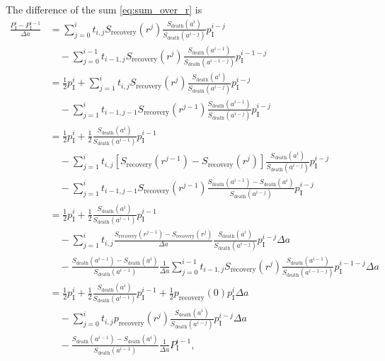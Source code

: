 \documentclass[12pt]{article}
\begin{document}
The difference of the sum \eqref{eq:sum_over_r} is
\begin{equation}
  \label{eq:sum_difference}
  \begin{split}
    \frac{P_{\mathrm{I}}^i - P_{\mathrm{I}}^{i - 1}}{\Delta a}
    &=
    \sum_{j = 0}^i t_{i, j} S_{\text{recovery}}(r^j)
    \frac{S_{\text{death}}(a^i)}{S_{\text{death}}(a^{i - j})}
    p_{\mathrm{I}}^{i - j}
    \\ & \quad {}
    - \sum_{j = 0}^{i - 1} t_{i - 1, j} S_{\text{recovery}}(r^j)
    \frac{S_{\text{death}}(a^{i - 1})}{S_{\text{death}}(a^{i - 1 - j})}
    p_{\mathrm{I}}^{i - 1 - j}
    \\
    &= \frac{1}{2} p_{\mathrm{I}}^i
    + \sum_{j = 1}^i t_{i, j} S_{\text{recovery}}(r^j)
    \frac{S_{\text{death}}(a^i)}{S_{\text{death}}(a^{i - j})}
    p_{\mathrm{I}}^{i - j}
    \\ & \quad {}
    - \sum_{j = 1}^i t_{i - 1, j - 1} S_{\text{recovery}}(r^{j - 1})
    \frac{S_{\text{death}}(a^{i - 1})}{S_{\text{death}}(a^{i - j})}
    p_{\mathrm{I}}^{i - j}
    \\
    &= \frac{1}{2} p_{\mathrm{I}}^i
    + \frac{1}{2}
    \frac{S_{\text{death}}(a^i)}{S_{\text{death}}(a^{i - 1})}
    p_{\mathrm{I}}^{i - 1}
    \\ & \quad {}
    - \sum_{j = 1}^i t_{i, j}
    \left[
      S_{\text{recovery}}(r^{j - 1})
      - S_{\text{recovery}}(r^j)
    \right]
    \frac{S_{\text{death}}(a^i)}{S_{\text{death}}(a^{i - j})}
    p_{\mathrm{I}}^{i - j}
    \\ & \quad {}
    - \sum_{j = 1}^i t_{i - 1, j - 1} S_{\text{recovery}}(r^{j - 1})
    \frac{S_{\text{death}}(a^{i - 1}) - S_{\text{death}}(a^i)}
    {S_{\text{death}}(a^{i - j})}
    p_{\mathrm{I}}^{i - j}
    \\
    &= \frac{1}{2} p_{\mathrm{I}}^i
    + \frac{1}{2}
    \frac{S_{\text{death}}(a^i)}{S_{\text{death}}(a^{i - 1})}
    p_{\mathrm{I}}^{i - 1}
    \\ & \quad {}
    - \sum_{j = 1}^i t_{i, j}
    \frac{S_{\text{recovery}}(r^{j - 1}) - S_{\text{recovery}}(r^j)}
    {\Delta a}
    \frac{S_{\text{death}}(a^i)}{S_{\text{death}}(a^{i - j})}
    p_{\mathrm{I}}^{i - j} \Delta a
    \\ & \quad {}
    -
    \frac{S_{\text{death}}(a^{i - 1}) - S_{\text{death}}(a^i)}
    {S_{\text{death}}(a^{i - 1})}
    \frac{1}{\Delta a}
    \sum_{j = 0}^{i - 1} t_{i - 1, j} S_{\text{recovery}}(r^j)
    \frac{S_{\text{death}}(a^{i - 1})}{S_{\text{death}}(a^{i - 1 - j})}
    p_{\mathrm{I}}^{i - 1 - j} \Delta a
    \\
    &= \frac{1}{2} p_{\mathrm{I}}^i
    + \frac{1}{2}
    \frac{S_{\text{death}}(a^i)}{S_{\text{death}}(a^{i - 1})}
    p_{\mathrm{I}}^{i - 1}
    + \frac{1}{2} p_{\text{recovery}}(0) p_{\mathrm{I}}^i \Delta a
    \\ & \quad {}
    - \sum_{j = 0}^i t_{i, j} p_{\text{recovery}}(r^j)
    \frac{S_{\text{death}}(a^i)}{S_{\text{death}}(a^{i - j})}
    p_{\mathrm{I}}^{i - j} \Delta a
    \\ & \quad {}
    - \frac{S_{\text{death}}(a^{i - 1}) - S_{\text{death}}(a^i)}
    {S_{\text{death}}(a^{i - 1})}
    \frac{1}{\Delta a} P_{\mathrm{I}}^{i - 1},
  \end{split}
\end{equation}
\end{document}
